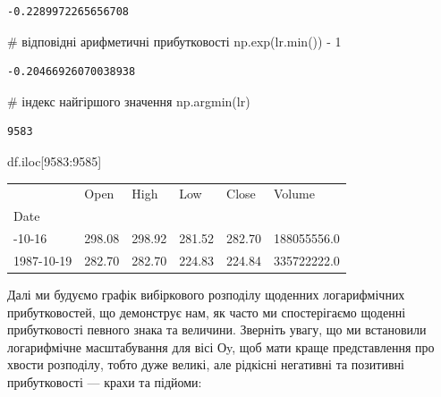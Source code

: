 \documentclass[
  letterpaper,
]{report}
\newenvironment{Shaded}{\begin{snugshade}}{\end{snugshade}}
\newcommand{\BuiltInTok}[1]{\textcolor[rgb]{0.00,0.23,0.31}{#1}}
\newcommand{\CommentTok}[1]{\textcolor[rgb]{0.37,0.37,0.37}{#1}}
\newcommand{\DecValTok}[1]{\textcolor[rgb]{0.68,0.00,0.00}{#1}}
\newcommand{\NormalTok}[1]{\textcolor[rgb]{0.00,0.23,0.31}{#1}}
\newcommand{\OperatorTok}[1]{\textcolor[rgb]{0.37,0.37,0.37}{#1}}
\begin{document}
\begin{verbatim}
-0.2289972265656708
\end{verbatim}

\begin{Shaded}
\begin{Highlighting}[]
\CommentTok{\# відповідні арифметичні прибутковості}
\NormalTok{np.exp(lr.}\BuiltInTok{min}\NormalTok{()) }\OperatorTok{{-}} \DecValTok{1}
\end{Highlighting}
\end{Shaded}

\begin{verbatim}
-0.20466926070038938
\end{verbatim}

\begin{Shaded}
\begin{Highlighting}[]
\CommentTok{\# індекс найгіршого значення}
\NormalTok{np.argmin(lr)}
\end{Highlighting}
\end{Shaded}

\begin{verbatim}
9583
\end{verbatim}

\begin{Shaded}
\begin{Highlighting}[]
\NormalTok{df.iloc[}\DecValTok{9583}\NormalTok{:}\DecValTok{9585}\NormalTok{]}
\end{Highlighting}
\end{Shaded}

\begin{longtable}[]{@{}llllll@{}}
\toprule\noalign{}
& Open & High & Low & Close & Volume \\
Date & & & & & \\
\midrule\noalign{}
\endhead
\bottomrule\noalign{}
\endlastfoot
1987-10-16 & 298.08 & 298.92 & 281.52 & 282.70 & 188055556.0 \\
1987-10-19 & 282.70 & 282.70 & 224.83 & 224.84 & 335722222.0 \\
\end{longtable}

Далі ми будуємо графік вибіркового розподілу щоденних логарифмічних
прибутковостей, що демонструє нам, як часто ми спостерігаємо щоденні
прибутковості певного знака та величини. Зверніть увагу, що ми
встановили логарифмічне масштабування для вісі Оy, щоб мати краще
представлення про хвости розподілу, тобто дуже великі, але рідкісні
негативні та позитивні прибутковості --- крахи та підйоми:
\end{document}
